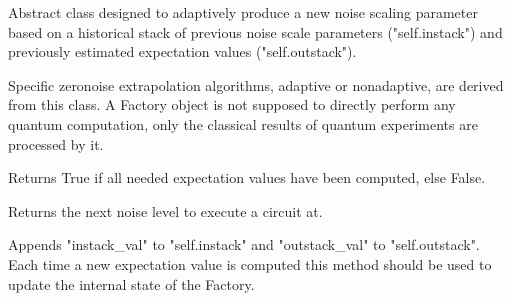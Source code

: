 \documentclass[letterpaper,10pt,english]{sphinxmanual}
\begin{document}
\begin{fulllineitems}
\label{\detokenize{apidoc:mitiq.factories.Factory}}
Abstract class designed to adaptively produce a new noise scaling parameter
based on a historical stack of previous noise scale parameters ("self.instack")
and previously estimated expectation values ("self.outstack").

Specific zero\sphinxhyphen{}noise extrapolation algorithms, adaptive or non\sphinxhyphen{}adaptive,
are derived from this class.
A Factory object is not supposed to directly perform any quantum computation,
only the classical results of quantum experiments are processed by it.

\begin{fulllineitems}
\label{\detokenize{apidoc:mitiq.factories.Factory.is_converged}}
Returns True if all needed expectation values have been computed, else False.

\end{fulllineitems}


\begin{fulllineitems}
\label{\detokenize{apidoc:mitiq.factories.Factory.next}}
Returns the next noise level to execute a circuit at.

\end{fulllineitems}


\begin{fulllineitems}
\label{\detokenize{apidoc:mitiq.factories.Factory.push}}
Appends "instack\_val" to "self.instack" and "outstack\_val" to "self.outstack".
Each time a new expectation value is computed this method should be used
to update the internal state of the Factory.


\end{fulllineitems}
\end{fulllineitems}
\end{document}

